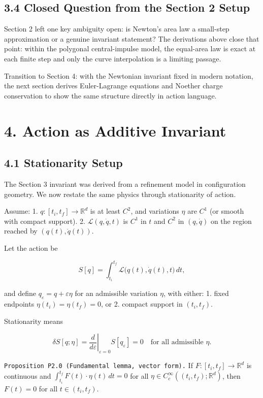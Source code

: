 \documentclass[
]{article}
\begin{document}
\subsection{3.4 Closed Question from the Section 2
Setup}\label{closed-question-from-the-section-2-setup}

Section 2 left one key ambiguity open: is Newton's area law a small-step
approximation or a genuine invariant statement? The derivations above
close that point: within the polygonal central-impulse model, the
equal-area law is exact at each finite step and only the curve
interpolation is a limiting passage.

Transition to Section 4: with the Newtonian invariant fixed in modern
notation, the next section derives Euler-Lagrange equations and Noether
charge conservation to show the same structure directly in action
language.

\section{4. Action as Additive
Invariant}\label{action-as-additive-invariant}

\subsection{4.1 Stationarity Setup}\label{stationarity-setup}

The Section 3 invariant was derived from a refinement model in
configuration geometry. We now restate the same physics through
stationarity of action.

Assume: 1. \(q:[t_i,t_f]\to\mathbb R^d\) is at least \(C^2\), and
variations \(\eta\) are \(C^1\) (or smooth with compact support). 2.
\(\mathcal L(q,\dot q,t)\) is \(C^1\) in \(t\) and \(C^2\) in
\((q,\dot q)\) on the region reached by \((q(t),\dot q(t))\).

Let the action be

\[
S[q]=\int_{t_i}^{t_f}\mathcal L\big(q(t),\dot q(t),t\big)\,dt,
\]

and define \(q_\varepsilon=q+\varepsilon\eta\) for an admissible
variation \(\eta\), with either: 1. fixed endpoints
\(\eta(t_i)=\eta(t_f)=0\), or 2. compact support in \((t_i,t_f)\).

Stationarity means

\[
\delta S[q;\eta]
=\left.\frac{d}{d\varepsilon}\right|_{\varepsilon=0} S[q_\varepsilon]
=0
\quad\text{for all admissible }\eta.
\]

\texttt{Proposition\ P2.0\ (Fundamental\ lemma,\ vector\ form).} If
\(F:[t_i,t_f]\to\mathbb R^d\) is continuous and
\(\int_{t_i}^{t_f} F(t)\cdot\eta(t)\,dt=0\) for all
\(\eta\in C_c^\infty((t_i,t_f);\mathbb R^d)\), then \(F(t)=0\) for all
\(t\in(t_i,t_f)\).
\end{document}

